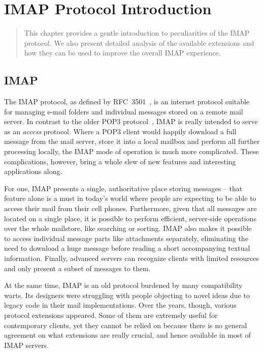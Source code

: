 \documentclass[trojita]{subfiles}
\begin{document}
\chapter{IMAP Protocol Introduction}
\label{sec:imap-protocol}

\begin{abstract}
This chapter provides a gentle introduction to peculiarities of the IMAP protocol.  We also present detailed analysis of
the available extensions and how they can be used to improve the overall IMAP experience.
\end{abstract}

\section{IMAP}

The IMAP protocol, as defined by RFC~3501~\cite{rfc-imap}, is an internet protocol suitable for managing e-mail folders
and individual messages stored on a remote mail server.  In contrast to the older POP3 protocol~\cite{rfc-pop3}, IMAP is
really intended to serve as an {\em access} protocol.  Where a POP3 client would happily download a full message from
the mail server, store it into a local mailbox and perform all further processing locally, the IMAP mode of operation is
much more complicated.  These complications, however, bring a whole slew of new features and interesting applications
along.

For one, IMAP presents a single, authoritative place storing messages -- that feature alone is a must in today's world
where people are expecting to be able to access their mail from their cell phones.  Furthermore, given that all messages
are located on a single place, it is possible to perform efficient, server-side operations over the whole mailstore,
like searching or sorting.  IMAP also makes it possible to access individual message parts like attachments separately,
eliminating the need to download a huge message before reading a short accompanying textual information.  Finally,
advanced servers can recognize clients with limited resources and only present a subset of messages to them.

At the same time, IMAP is an old protocol burdened by many compatibility warts.  Its designers were struggling with
people objecting to novel ideas due to legacy code in their mail implementations.  Over the years, though, various
protocol extensions appeared.  Some of them are extremely useful for contemporary clients, yet they cannot be relied on
because there is no general agreement on what extensions are really crucial, and hence available in most of IMAP
servers.
\end{document}
